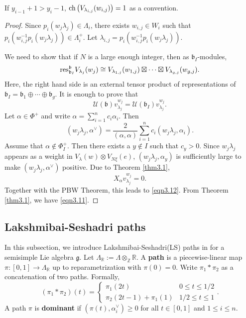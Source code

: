 \documentclass[12pt]{amsart}
\theoremstyle{definition}
\theoremstyle{remark}
\newcommand{\R}{\mathbb{R}}
\newcommand{\Z}{\mathbb{Z}}
\begin{document}
If $y_{i-1}+1 > y_i - 1$, ${\rm ch} \left( V_{\lambda_{i,j}}(w_{i,j} )  \right) = 1$ as a convention.

\begin{proof}
Since $p_i (w_j \lambda_j) \in \Lambda_i$, there exists $w_{i,j} \in W_i$ such that $p_i(w_{i,j}^{-1} p_i (w_j \lambda_j)) \in \Lambda_i^+$. Let $\lambda_{i,j} = p_i(w_{i,j}^{-1} p_i (w_j \lambda_j))$.

We need to show that if $N$ is a large enough integer, then as $\mathfrak{b}_I$-modules,
\begin{equation}\label{eqn3.11}
{\rm res}_{\mathfrak{b}_I}^\mathfrak{b} V_{\lambda_j}(w_j) \cong V_{\lambda_{1,j}}(w_{1,j}) \boxtimes \cdots \boxtimes V_{\lambda_{g,j}}(w_{g,j}).
\end{equation}
Here, the right hand side is an external tensor product of representations of $\mathfrak{b}_I = \mathfrak{b}_1 \oplus \cdots \oplus \mathfrak{b}_g$.
It is enough to prove that
\begin{equation}\label{eqn3.12}
\mathcal{U} (\mathfrak{b}) v^{w_j}_{\lambda_j} = \mathcal{U} (\mathfrak{b}_I) v^{w_j}_{\lambda_j}.
\end{equation}
Let $\alpha \in \Phi^+$ and write $\alpha = \sum_{i=1}^{n} c_i \alpha_i$. Then
\begin{equation}\label{eqn3.13}
( w_j \lambda_j , \alpha^\vee ) = \frac{2}{( \alpha , \alpha )}\sum_{i=1}^{n} c_i ( w_j \lambda_j , \alpha_i ).
\end{equation}
Assume that $\alpha \notin \Phi_I^+$. Then there exists a $y \notin I$ such that $c_y >0$. Since $w_j \lambda_j$ appears as a weight in $V_\lambda (w) \otimes V_{N\xi} (e)$, $( w_j \lambda_j , \alpha_y )$ is sufficiently large to make $( w_j \lambda_j , \alpha^\vee )$ positive. Due to Theorem \ref{thm3.1},
\begin{equation}\label{eqn3.14}
X_\alpha v^{w_j}_{\lambda_j} = 0.
\end{equation}
Together with the PBW Theorem, this leads to \eqref{eqn3.12}. From Theorem \ref{thm3.1}, we have \eqref{eqn3.11}.
\end{proof}



\subsection{Lakshmibai-Seshadri paths}

In this subsection, we introduce Lakshmibai-Seshadri(LS) paths in \cite{MR1887117} for a semisimple Lie algebra $\mathfrak{g}$. Let $\Lambda_\R := \Lambda \otimes_\Z \R$. A \textbf{path} is a piecewise-linear map $\pi : [0,1]\rightarrow \Lambda_\R$ up to reparametrization with $\pi (0) = 0$. Write $\pi_1 * \pi_2$ as a concatenation of two paths. Formally,
\begin{equation}\label{eqn3.15}
(\pi_1 * \pi_2) (t) =
\begin{cases}
\pi_1 (2t) & 0\leq t \leq 1/2 \\
\pi_2 (2t-1) + \pi_1 (1) & 1/2 \leq t \leq 1
\end{cases}
.
\end{equation}
A path $\pi$ is \textbf{dominant} if $( \pi (t) , \alpha_i^\vee ) \geq 0$ for all $t \in [0,1]$ and $1 \leq i \leq n$.
\end{document}
